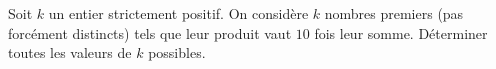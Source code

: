 Soit $k$ un entier strictement positif. On considère $k$ nombres premiers (pas forcément distincts) tels que leur produit vaut $10$ fois leur somme. Déterminer toutes les valeurs de $k$ possibles.